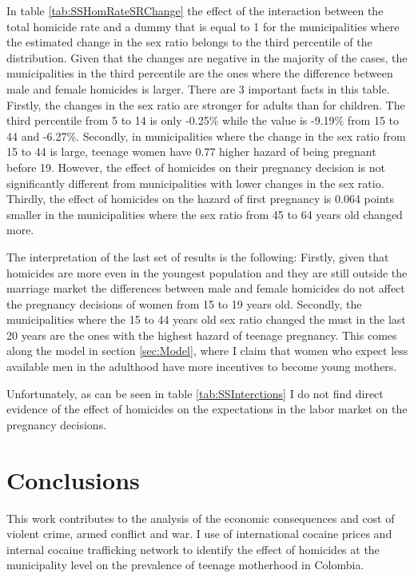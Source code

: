 \documentclass[a4paper,10pt,twocolumn,preprint,3p,authoryear]{elsarticle}
\begin{document}
In table \ref{tab:SSHomRateSRChange} the effect of the interaction between the total homicide rate and a dummy that is equal to 1 for the municipalities where the estimated change in the sex ratio belongs to the third percentile of the distribution. Given that the changes are negative in the majority of the cases, the municipalities in the third percentile are the ones where the difference between male and female homicides is larger. There are 3 important facts in this table. Firstly, the changes in the sex ratio are stronger for adults than for children. The third percentile from 5 to 14 is only -0.25\% while the value is -9.19\% from 15 to 44 and -6.27\%. Secondly, in municipalities where the change in the sex ratio from 15 to 44 is large, teenage women have 0.77 higher hazard of being pregnant before 19. However, the effect of homicides on their pregnancy decision is not significantly different from municipalities with lower changes in the sex ratio. Thirdly, the effect of homicides on the hazard of first pregnancy is 0.064 points smaller in the municipalities where the sex ratio from 45 to 64 years old changed more. 

The interpretation of the last set of results is the following: Firstly, given that homicides are more even in the youngest population and they are still outside the marriage market the differences between male and female homicides do not affect the pregnancy decisions of women from 15 to 19 years old. Secondly, the municipalities where the 15 to 44 years old sex ratio changed the must in the last 20 years are the ones with the highest hazard of teenage pregnancy. This comes along the model in section \ref{sec:Model}, where I claim that women who expect less available men in the adulthood have more incentives to become young mothers.

Unfortunately, as can be seen in table \ref{tab:SSInterctions} I do not find direct evidence of the effect of homicides on the expectations in the labor market on the pregnancy decisions. 

\section{Conclusions\label{sec:Conclusions}}

This work contributes to the analysis of the economic consequences and cost of violent crime, armed conflict and war. I use of international cocaine prices and internal cocaine trafficking network to identify the effect of homicides at the municipality level on the prevalence of teenage motherhood in Colombia. 
\end{document}

